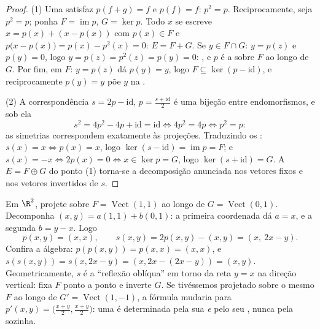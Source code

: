 \begin{proof}
(1) Uma  satisfaz $p(f + g) = f$ e $p(f) = f$: $p^2 = p$. Reciprocamente,
seja $p^2 = p$; ponha $F = \operatorname{im} p$, $G = \ker
p$. Todo $x$ se escreve $x = p(x) + (x - p(x))$ com
$p(x) \in F$ e $p\bigl(x - p(x)\bigr) = p(x) - p^2(x) = 0$: $E = F + G$. Se $y \in
F \cap G$: $y = p(z)$ e $p(y) = 0$, logo $y = p(z) = p^2(z) = p(y) =
0$: , e $p$ é a  sobre $F$ ao longo de $G$. Por fim, em
$F$: $y = p(z)$ dá $p(y) = y$, logo $F \subseteq
\ker(p - \mathrm{id})$, e reciprocamente $p(y) = y$ põe $y$
na .

(2) A correspondência $s = 2p - \mathrm{id}$, $p = \frac{s +
\mathrm{id}}2$ é uma bijeção entre
endomorfismos, e sob ela
\[
s^2 = 4p^2 - 4p + \mathrm{id} = \mathrm{id}
\iff 4p^2 = 4p \iff p^2 = p :
\]
as simetrias correspondem exatamente às projeções. Traduzindo os
: $s(x) = x \iff p(x) = x$, logo $\ker(s - \mathrm{id}) =
\operatorname{im} p = F$; e $s(x) = -x \iff 2p(x) = 0 \iff x
\in \ker p = G$, logo $\ker(s + \mathrm{id}) = G$. A 
$E = F \oplus G$ do ponto (1) torna-se a decomposição anunciada nos vetores
fixos e nos vetores invertidos de $s$.
\end{proof}

\begin{example}
\label{ex:b1:linmaps:projexplicit}
Em $\R^2$, projete sobre $F = \operatorname{Vect}(1,1)$ ao longo de $G =
\operatorname{Vect}(0,1)$. Decomponha $(x, y) = a(1,1) + b(0,1)$:
a primeira coordenada dá $a = x$, e a segunda $b = y - x$. Logo
\[
p(x, y) = (x, x),
\qquad
s(x, y) = 2p(x,y) - (x,y) = (x,\ 2x - y).
\]
Confira a álgebra: $p(p(x,y)) = p(x,x) = (x,x)$, e $s(s(x,y)) =
s(x, 2x - y) = (x, 2x - (2x - y)) = (x, y)$. Geometricamente, $s$ é a
``reflexão oblíqua'' em torno da reta $y = x$ na direção vertical:
fixa $F$ ponto a ponto e inverte $G$. Se tivéssemos projetado sobre
o mesmo $F$ ao longo de $G' =
\operatorname{Vect}(1,-1)$, a fórmula mudaria para $p'(x,y) = \bigl(\frac{x+y}2, \frac{x+y}2\bigr)$: uma
 é determinada pela sua  \emph{e} pelo seu ,
nunca pela  sozinha.
\end{example}

